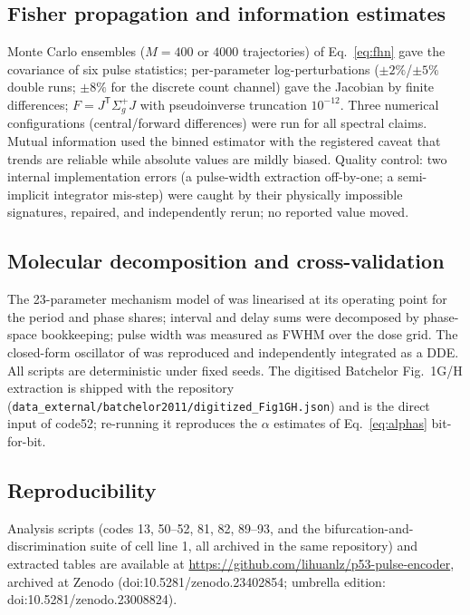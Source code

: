 \documentclass[11pt,a4paper]{article}
\begin{document}
\subsection{Fisher propagation and information estimates}

Monte Carlo ensembles ($M=400$ or $4000$ trajectories) of Eq.~\eqref{eq:fhn} gave the covariance of six pulse statistics; per-parameter log-perturbations ($\pm2\%$/$\pm5\%$ double runs; $\pm8\%$ for the discrete count channel) gave the Jacobian by finite differences; $F=J^{\mathsf T}\Sigma_g^{+}J$ with pseudoinverse truncation $10^{-12}$. Three numerical configurations (central/forward differences) were run for all spectral claims. Mutual information used the binned estimator with the registered caveat that trends are reliable while absolute values are mildly biased. Quality control: two internal implementation errors (a pulse-width extraction off-by-one; a semi-implicit integrator mis-step) were caught by their physically impossible signatures, repaired, and independently rerun; no reported value moved.

\subsection{Molecular decomposition and cross-validation}

The 23-parameter mechanism model of \cite{Monke2017,Venkatachalapathy2025} was linearised at its operating point for the period and phase shares; interval and delay sums were decomposed by phase-space bookkeeping; pulse width was measured as FWHM over the dose grid. The closed-form oscillator of \cite{Belgacem2026} was reproduced and independently integrated as a DDE. All scripts are deterministic under fixed seeds. The digitised Batchelor Fig.~1G/H extraction is shipped with the repository (\texttt{data\_external/batchelor2011/digitized\_Fig1GH.json}) and is the direct input of code52; re-running it reproduces the $\alpha$ estimates of Eq.~\eqref{eq:alphas} bit-for-bit.

\subsection{Reproducibility}

Analysis scripts (codes 13, 50--52, 81, 82, 89--93, and the bifurcation-and-discrimination suite of cell line 1, all archived in the same repository) and extracted tables are available at \url{https://github.com/lihuanlz/p53-pulse-encoder}, archived at Zenodo (doi:10.5281/zenodo.23402854; umbrella edition: doi:10.5281/zenodo.23008824).
\end{document}
